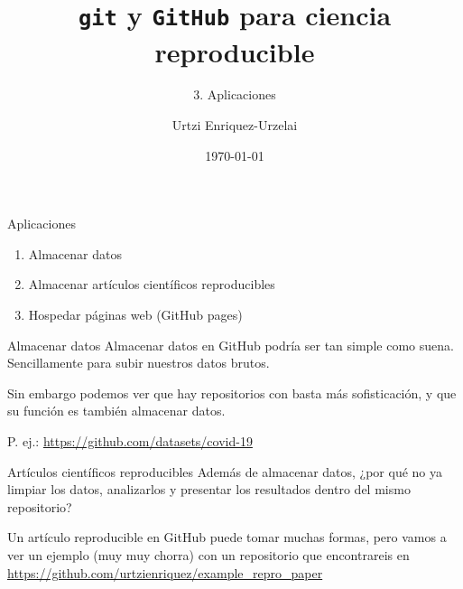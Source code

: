 \documentclass{beamer}
\title{\texttt{git} y \texttt{GitHub} para ciencia reproducible}
\subtitle{3. Aplicaciones}
\author{Urtzi Enriquez-Urzelai\inst{1}}
\institute{ 
    \inst{1} Institute of Vertebrate Biology,
    \newline  
    Czech Academy of Sciences 
    \newline \newline
    \faGithub \hspace*{0.2ex} \href{https://github.com/urtzienriquez}{\color{blue}{GitHub}}
    \hspace*{0.5ex} \faGlobe \hspace*{0.2ex} \href{https://urtzienriquez.github.io/}{\color{blue}{webpage}}
    }
\date{\today}
\begin{document}
\begin{frame}
    \titlepage 
\end{frame}

\logo{}



\begin{frame}{Aplicaciones}
    \begin{enumerate}
        \item Almacenar datos
        \item Almacenar artículos científicos reproducibles
        \item Hospedar páginas web (GitHub pages)
    \end{enumerate}
\end{frame}


\begin{frame}{Almacenar datos}
    Almacenar datos en GitHub podría ser tan simple como suena.
    Sencillamente para subir nuestros datos brutos. \newline

    Sin embargo podemos ver que hay repositorios con basta más 
    sofisticación, y que su función es también almacenar datos. \newline

    P. ej.: \href{https://github.com/datasets/covid-19}{https://github.com/datasets/covid-19}
\end{frame}


\begin{frame}{Artículos científicos reproducibles}
    Además de almacenar datos, ¿por qué no ya limpiar los datos, analizarlos
    y presentar los resultados dentro del mismo repositorio? \newline

    Un artículo reproducible en GitHub puede tomar muchas formas,
    pero vamos a ver un ejemplo (muy muy chorra) con un repositorio
    que encontrareis en \href{https://github.com/urtzienriquez/example_repro_paper}{https://github.com/urtzienriquez/example\_repro\_paper}
\end{frame}
\end{document}
